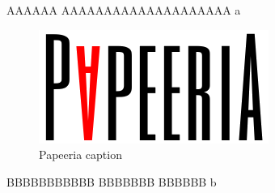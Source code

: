 \documentclass{article}
\begin{document}
\vspace*{\fill} \vspace*{-5ex}
AAAAAA AAAAAAAAAAAAAAAAAAAA a
\begin{figure}[tbp]
    \begin{center}
        \includegraphics{papeeria.png}
    \end{center}
    \caption{Papeeria caption}
\end{figure}

BBBBBBBBBBB BBBBBBB BBBBBB b
\vspace*{\fill}
\end{document}
